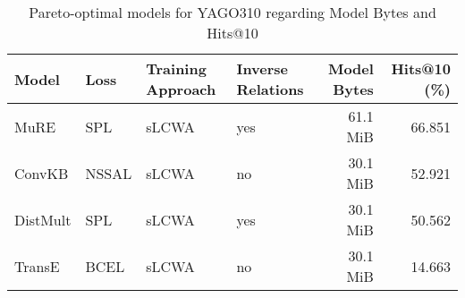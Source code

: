 \begin{table}[H]
\centering
\caption{Pareto-optimal models for YAGO310 regarding Model Bytes and Hits@10}
\label{tab:skyline_yago310_model_bytes}
\begin{tabular}{llllrr}
\toprule
   Model &  Loss & Training Approach & Inverse Relations & Model Bytes &  Hits@10 (\%) \\
\midrule
    MuRE &   SPL &             sLCWA &               yes &    61.1 MiB &       66.851 \\
  ConvKB & NSSAL &             sLCWA &                no &    30.1 MiB &       52.921 \\
DistMult &   SPL &             sLCWA &               yes &    30.1 MiB &       50.562 \\
  TransE &  BCEL &             sLCWA &                no &    30.1 MiB &       14.663 \\
\bottomrule
\end{tabular}
\end{table}


